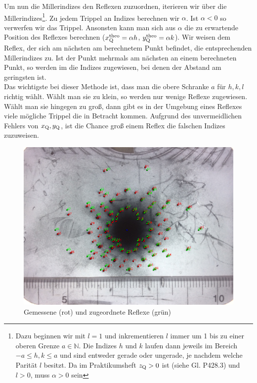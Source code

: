 Um nun die Millerindizes den Reflexen zuzuordnen, iterieren wir über die Millerindizes\footnote{Dazu beginnen wir mit $l=1$ und inkrementieren $l$ immer um 1 bis zu einer oberen Grenze $a \in \mathbb{N}$. Die Indizes $h$ und $k$ laufen dann jeweils im Bereich $-a \leq h,k \leq a$ und sind entweder gerade oder ungerade, je nachdem welche Parität $l$ besitzt. Da im  Praktikumsheft $z_\mathrm{Q} > 0$ ist (siehe Gl. P428.3) und $l > 0$, muss $\alpha > 0$ sein}. Zu jedem Trippel an Indizes berechnen wir $\alpha$. Ist $\alpha < 0$ so verwerfen wir das Trippel. Ansonsten kann man sich aus $\alpha$ die zu erwartende Position des Reflexes berechnen ($x_\mathrm{Q}^\mathrm{theo} = \alpha h$, $y_\mathrm{Q}^\mathrm{theo} = \alpha k$). Wir weisen dem Reflex, der sich am nächsten am berechnetem Punkt befindet, die entsprechenden Millerindizes zu. Ist der Punkt mehrmals am nächsten an einem berechneten Punkt, so werden im die Indizes zugewiesen, bei denen der Abstand am geringsten ist.\\

Das wichtigste bei dieser Methode ist, dass man die obere Schranke $a$ für $h,k,l$ richtig wählt. Wählt man sie zu klein, so werden nur wenige Reflexe zugewiesen. Wählt man sie hingegen zu groß, dann gibt es in der Umgebung eines Reflexes viele mögliche Trippel die in Betracht kommen. Aufgrund des unvermeidlichen Fehlers von $x_\mathrm{Q}, y_\mathrm{Q}$, ist die Chance groß einem Reflex die falschen Indizes zuzuweisen.\\

\begin{figure}
\centering
\includegraphics[scale=0.6]{data/laue/draw/laue.png}
\caption{Gemessene (rot) und zugeordnete Reflexe (grün)}
\label{fig:laue_calc}
\end{figure}

